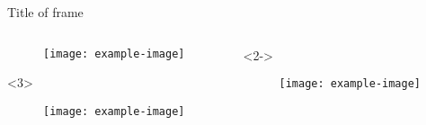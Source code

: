 \documentclass{beamer}
\begin{document}
\begin{frame}[t]{Title of frame}
    \begin{columns}[T,onlytextwidth]
        \begin{column}{.4\textwidth}
            \begin{minipage}{\textwidth}
                \begin{figure}
                    \texttt{[image: example-image]}
                \end{figure}
            \end{minipage}  
            \begin{onlyenv}<3>
                \begin{minipage}{\textwidth}
                    \begin{figure}
                        \texttt{[image: example-image]}
                    \end{figure}
                \end{minipage}
            \end{onlyenv}
        \end{column}
        \begin{column}{.4\textwidth}
            \begin{onlyenv}<2->
                \begin{minipage}{\textwidth}
                    \begin{figure}
                        \texttt{[image: example-image]}
                    \end{figure}
                \end{minipage}
            \end{onlyenv}
        \end{column}
    \end{columns}
\end{frame}
\end{document}
